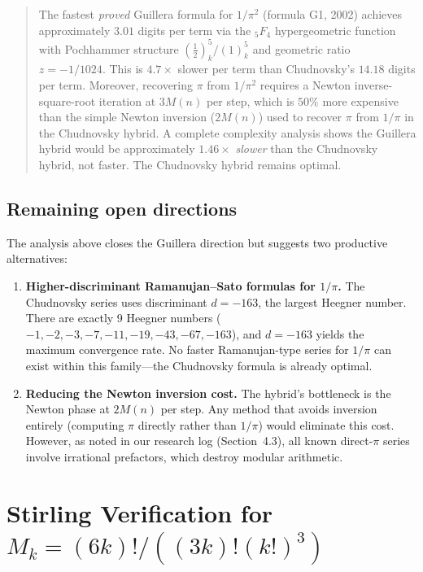 \documentclass[11pt]{article}
\begin{document}
\begin{quote}
The fastest \emph{proved} Guillera formula for $1/\pi^2$ (formula G1, 2002) achieves approximately $3.01$ digits per term via the ${}_5F_4$ hypergeometric function with Pochhammer structure $(\tfrac{1}{2})_k^5 / (1)_k^5$ and geometric ratio $z = -1/1024$. This is $4.7\times$ slower per term than Chudnovsky's $14.18$ digits per term. Moreover, recovering $\pi$ from $1/\pi^2$ requires a Newton inverse-square-root iteration at $3M(n)$ per step, which is $50\%$ more expensive than the simple Newton inversion ($2M(n)$) used to recover $\pi$ from $1/\pi$ in the Chudnovsky hybrid. A complete complexity analysis shows the Guillera hybrid would be approximately $1.46\times$ \emph{slower} than the Chudnovsky hybrid, not faster. The Chudnovsky hybrid remains optimal.
\end{quote}

\subsection{Remaining open directions}

The analysis above closes the Guillera direction but suggests two productive alternatives:

\begin{enumerate}
\item \textbf{Higher-discriminant Ramanujan--Sato formulas for $1/\pi$.} The Chudnovsky series uses discriminant $d = -163$, the largest Heegner number. There are exactly 9 Heegner numbers ($-1, -2, -3, -7, -11, -19, -43, -67, -163$), and $d = -163$ yields the maximum convergence rate. No faster Ramanujan-type series for $1/\pi$ can exist within this family---the Chudnovsky formula is already optimal.

\item \textbf{Reducing the Newton inversion cost.} The hybrid's bottleneck is the Newton phase at $2M(n)$ per step. Any method that avoids inversion entirely (computing $\pi$ directly rather than $1/\pi$) would eliminate this cost. However, as noted in our research log (Section~4.3), all known direct-$\pi$ series involve irrational prefactors, which destroy modular arithmetic.
\end{enumerate}

\appendix
\section{Stirling Verification for $M_k = (6k)!/((3k)!(k!)^3)$}
\label{sec:stirling}
\end{document}
